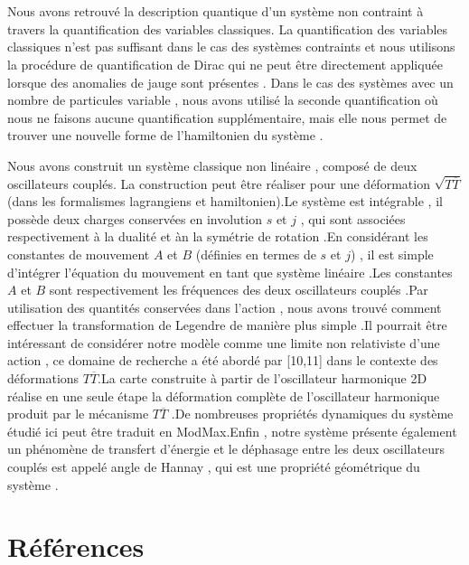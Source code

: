 \documentclass[12pt,a4paper, openany]{report}
\begin{document}
	\chapter*{\color{green!30!blue}{Conclusion et Perspectives}}
	Nous avons retrouvé la description quantique d'un système non contraint à travers la quantification des variables classiques. La quantification des variables classiques n'est pas suffisant dans le cas des systèmes contraints et nous utilisons la procédure de quantification de Dirac qui  ne peut \^{e}tre directement appliquée lorsque des anomalies de jauge sont présentes . Dans le cas des systèmes avec un nombre de particules variable , nous avons utilisé  la seconde quantification où nous ne faisons aucune quantification supplémentaire, mais elle nous permet de trouver une nouvelle forme de l'hamiltonien du système .\par Nous avons construit un système classique non linéaire , composé de deux oscillateurs couplés. La construction peut \^{e}tre réaliser pour une déformation $\sqrt{T\overline{T}}$ (dans les formalismes lagrangiens et hamiltonien).Le système est intégrable , il possède deux charges conservées en involution $s$ et $j$ , qui sont associées respectivement à la dualité et àn la symétrie de rotation .En considérant les constantes de mouvement $A$ et $B$ (définies en termes de $s$ et $j$) , il est simple d'intégrer l'équation du mouvement en tant que système linéaire .Les constantes $A$ et $B$ sont respectivement les fréquences des deux oscillateurs couplés .Par utilisation des quantités conservées dans l'action , nous avons trouvé comment effectuer la transformation de Legendre de manière plus simple .Il pourrait \^{e}tre intéressant de considérer notre modèle comme une limite non relativiste d'une action , ce domaine de recherche a été abordé par [10,11] dans le contexte des déformations $T\overline{T}$.La carte construite à partir de l'oscillateur harmonique 2D réalise en une seule étape la déformation complète de l'oscillateur harmonique  produit par le mécanisme $T\overline{T}$  .De nombreuses propriétés dynamiques du système étudié ici peut \^{e}tre traduit en ModMax.Enfin , notre système présente également un phénomène de transfert d'énergie et le déphasage entre les deux oscillateurs couplés est appelé angle de Hannay , qui est une propriété géométrique du système .
	
	\chapter*{Références}
		
\end{document}
